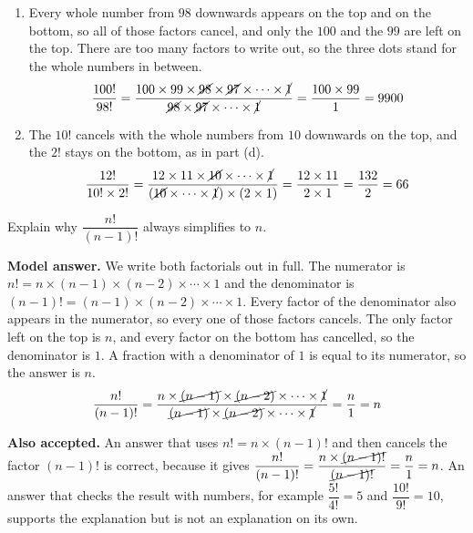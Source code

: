\documentclass[12pt,a4paper]{article}
\newcommand{\qhead}[2]{\par\addvspace{9pt}%
  \noindent{\bfseries Q#1.}\enspace #2\par\nobreak}
\newcommand{\modelans}{\par\smallskip
  \noindent\textbf{\color{blue!50!black}Model answer.}\space}
\newcommand{\alsoacc}{\par\smallskip
  \noindent\textbf{\color{blue!50!black}Also accepted.}\space}
\begin{document}
\begin{enumerate}
\item Every whole number from $98$ downwards appears on the top and on the
bottom, so all of those factors cancel, and only the $100$ and the $99$ are
left on the top. There are too many factors to write out, so the three dots
stand for the whole numbers in between.
\[\frac{100!}{98!}
  =\frac{100\times99\times\cancel{98}\times\cancel{97}\times\cdots\times\cancel{1}}
   {\cancel{98}\times\cancel{97}\times\cdots\times\cancel{1}}
  =\frac{100\times99}{1}=9900\]

\item The $10!$ cancels with the whole numbers from $10$ downwards on the top,
and the $2!$ stays on the bottom, as in part (d).
\[\frac{12!}{10!\times2!}
  =\frac{12\times11\times\cancel{10}\times\cdots\times\cancel{1}}
   {(\cancel{10}\times\cdots\times\cancel{1})\times(2\times1)}
  =\frac{12\times11}{2\times1}=\frac{132}{2}=66\]
\end{enumerate}

\qhead{12}{Explain why $\dfrac{n!}{(n-1)!}$ always simplifies to $n$.}
\modelans
We write both factorials out in full. The numerator is
$n!=n\times(n-1)\times(n-2)\times\cdots\times1$ and the denominator is
$(n-1)!=(n-1)\times(n-2)\times\cdots\times1$. Every factor of the denominator
also appears in the numerator, so every one of those factors cancels. The only
factor left on the top is $n$, and every factor on the bottom has cancelled, so
the denominator is $1$. A fraction with a denominator of $1$ is equal to its
numerator, so the answer is $n$.
\[\frac{n!}{(n-1)!}
  =\frac{n\times\cancel{(n-1)}\times\cancel{(n-2)}\times\cdots\times\cancel{1}}
   {\cancel{(n-1)}\times\cancel{(n-2)}\times\cdots\times\cancel{1}}
  =\frac{n}{1}=n\]
\alsoacc
An answer that uses $n!=n\times(n-1)!$ and then cancels the factor $(n-1)!$ is
correct, because it gives
$\dfrac{n!}{(n-1)!}=\dfrac{n\times\cancel{(n-1)!}}{\cancel{(n-1)!}}
=\dfrac{n}{1}=n$. An answer that checks the result with numbers, for example
$\dfrac{5!}{4!}=5$ and $\dfrac{10!}{9!}=10$, supports the explanation but is
not an explanation on its own.

\newpage
\end{document}
